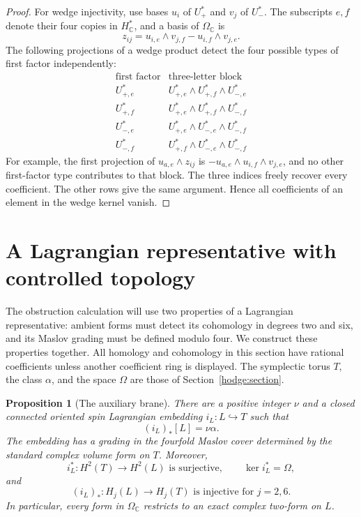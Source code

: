 \documentclass[11pt]{article}
\newtheorem{proposition}[theorem]{Proposition}
\theoremstyle{definition}
\theoremstyle{remark}
\numberwithin{equation}{section}
\begin{document}
\begin{proof}
For wedge injectivity, use bases $u_i$ of $U_+^*$ and $v_j$ of $U_-^*$.
The subscripts $e,f$ denote their four copies in $H_\mathbb C^*$, and a basis
of $\Omega_\mathbb C$ is
\[
 z_{ij}=u_{i,e}\wedge v_{j,f}-u_{i,f}\wedge v_{j,e}.
\]
The following projections of a wedge product detect the four possible
types of first factor independently:
\[
\begin{array}{c|c}
 \text{first factor}&\text{three-letter block}\\ \hline
 U_{+,e}^*&U_{+,e}^*\wedge U_{+,f}^*\wedge U_{-,e}^*\\
 U_{+,f}^*&U_{+,e}^*\wedge U_{+,f}^*\wedge U_{-,f}^*\\
 U_{-,e}^*&U_{+,e}^*\wedge U_{-,e}^*\wedge U_{-,f}^*\\
 U_{-,f}^*&U_{+,f}^*\wedge U_{-,e}^*\wedge U_{-,f}^*
\end{array}
\]
For example, the first projection of $u_{a,e}\wedge z_{ij}$ is
$-u_{a,e}\wedge u_{i,f}\wedge v_{j,e}$, and no other first-factor
type contributes to that block.  The three indices freely recover
every coefficient.  The other rows give the same argument.  Hence all
coefficients of an element in the wedge kernel vanish.
\end{proof}

\section{A Lagrangian representative with controlled topology}
\label{top:section}

The obstruction calculation will use two properties of a Lagrangian
representative: ambient forms must detect its cohomology in degrees two
and six, and its Maslov grading must be defined modulo four.  We construct
these properties together.  All homology and cohomology in this section
have rational coefficients unless another coefficient ring is displayed.
The symplectic torus $T$, the class $\alpha$, and the space $\Omega$ are
those of Section~\ref{hodge:section}.

\begin{proposition}[The auxiliary brane]
\label{top:brane}
There are a positive integer $\nu$ and a closed connected oriented spin
Lagrangian embedding $i_L:L\hookrightarrow T$ such that
\begin{equation}\label{top:brane-class}
 (i_L)_*[L]=\nu\alpha.
\end{equation}
The embedding has a grading in the fourfold Maslov cover determined by
the standard complex volume form on $T$.  Moreover,
\begin{equation}\label{top:brane-cohomology}
 i_L^*:H^2(T)\longrightarrow H^2(L)
 \text{ is surjective},\qquad \ker i_L^*=\Omega,
\end{equation}
and
\begin{equation}\label{top:brane-injections}
 (i_L)_*:H_j(L)\longrightarrow H_j(T)
 \text{ is injective for }j=2,6.
\end{equation}
In particular, every form in $\Omega_{\mathbb C}$ restricts to an exact complex
two-form on $L$.
\end{proposition}
\end{document}

